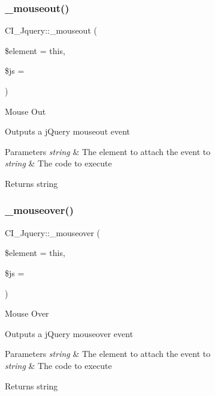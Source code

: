 \subsubsection{\texorpdfstring{\+\_\+mouseout()}{\_mouseout()}}
{\footnotesize\ttfamily C\+I\+\_\+\+Jquery\+::\+\_\+mouseout (\begin{DoxyParamCaption}\item[{}]{\$element = {\ttfamily \textquotesingle{}this\textquotesingle{}},  }\item[{}]{\$js = {\ttfamily \textquotesingle{}\textquotesingle{}} }\end{DoxyParamCaption})\hspace{0.3cm}{\ttfamily [protected]}}

Mouse Out

Outputs a j\+Query mouseout event


\begin{DoxyParams}{Parameters}
{\em string} & The element to attach the event to \\
\hline
{\em string} & The code to execute \\
\hline
\end{DoxyParams}
\begin{DoxyReturn}{Returns}
string 
\end{DoxyReturn}
\mbox{\label{class_c_i___jquery_a088ad6a426b26b9bd12d0dfe2262ac13}} 
\subsubsection{\texorpdfstring{\+\_\+mouseover()}{\_mouseover()}}
{\footnotesize\ttfamily C\+I\+\_\+\+Jquery\+::\+\_\+mouseover (\begin{DoxyParamCaption}\item[{}]{\$element = {\ttfamily \textquotesingle{}this\textquotesingle{}},  }\item[{}]{\$js = {\ttfamily \textquotesingle{}\textquotesingle{}} }\end{DoxyParamCaption})\hspace{0.3cm}{\ttfamily [protected]}}

Mouse Over

Outputs a j\+Query mouseover event


\begin{DoxyParams}{Parameters}
{\em string} & The element to attach the event to \\
\hline
{\em string} & The code to execute \\
\hline
\end{DoxyParams}
\begin{DoxyReturn}{Returns}
string 
\end{DoxyReturn}
\mbox{\label{class_c_i___jquery_aa720e3e22be279534ae106bf9c6ddb1f}} 
